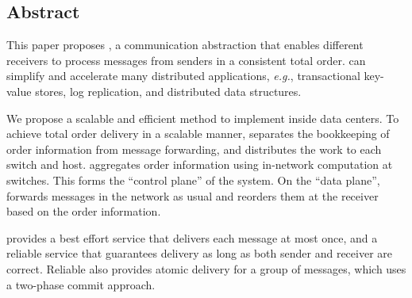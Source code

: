 \subsection*{Abstract}




This paper proposes \sys{}, a communication abstraction that enables different receivers to process messages from senders in a consistent total order.
\sys{} can simplify and accelerate many distributed applications, \emph{e.g.}, transactional key-value stores, log replication, and distributed data structures.

We propose a scalable and efficient method to implement \sys{} inside data centers. To achieve total order delivery in a scalable manner, \sys separates the bookkeeping of order information from message forwarding, and distributes the work to each switch and host. \sys aggregates order information using in-network computation at switches. This forms the ``control plane'' of the system. On the ``data plane'', \sys forwards messages in the network as usual and reorders them at the receiver based on the order information.

\sys{} provides a best effort service that delivers each message at most once, and a reliable service that guarantees delivery as long as both sender and receiver are correct. Reliable \sys{} also provides atomic delivery for a group of messages, which uses a two-phase commit approach.

